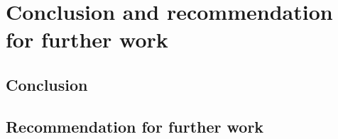 \chapter{Conclusion and recommendation for further work}
\section{Conclusion}
\section{Recommendation for further work}